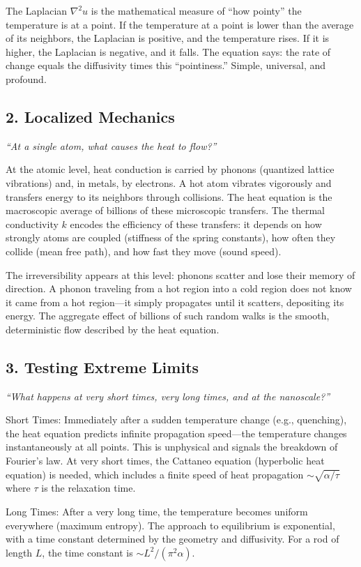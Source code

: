 The Laplacian $\nabla^2 u$ is the mathematical measure of ``how pointy'' the temperature is at a point. If the temperature at a point is lower than the average of its neighbors, the Laplacian is positive, and the temperature rises. If it is higher, the Laplacian is negative, and it falls. The equation says: the rate of change equals the diffusivity times this ``pointiness.'' Simple, universal, and profound.

\subsection*{2. Localized Mechanics}
\textit{``At a single atom, what causes the heat to flow?''}

At the atomic level, heat conduction is carried by phonons (quantized lattice vibrations) and, in metals, by electrons. A hot atom vibrates vigorously and transfers energy to its neighbors through collisions. The heat equation is the macroscopic average of billions of these microscopic transfers. The thermal conductivity $k$ encodes the efficiency of these transfers: it depends on how strongly atoms are coupled (stiffness of the spring constants), how often they collide (mean free path), and how fast they move (sound speed).

The irreversibility appears at this level: phonons scatter and lose their memory of direction. A phonon traveling from a hot region into a cold region does not know it came from a hot region---it simply propagates until it scatters, depositing its energy. The aggregate effect of billions of such random walks is the smooth, deterministic flow described by the heat equation.

\subsection*{3. Testing Extreme Limits}
\textit{``What happens at very short times, very long times, and at the nanoscale?''}

Short Times: Immediately after a sudden temperature change (e.g., quenching), the heat equation predicts infinite propagation speed---the temperature changes instantaneously at all points. This is unphysical and signals the breakdown of Fourier's law. At very short times, the Cattaneo equation (hyperbolic heat equation) is needed, which includes a finite speed of heat propagation $\sim \sqrt{\alpha/\tau}$ where $\tau$ is the relaxation time.

Long Times: After a very long time, the temperature becomes uniform everywhere (maximum entropy). The approach to equilibrium is exponential, with a time constant determined by the geometry and diffusivity. For a rod of length $L$, the time constant is $\sim L^2/(\pi^2\alpha)$.

